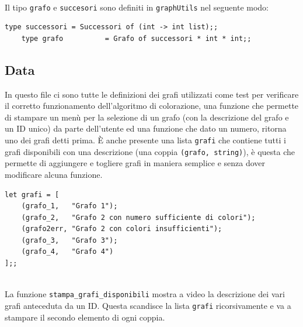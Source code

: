 \ \\
Il tipo \lstinline[style=cmd]|grafo| e \lstinline[style=cmd]|succesori|  sono definiti in \lstinline[style=cmd]|graphUtils| nel seguente modo:

\begin{lstlisting}[style=caml]
	type successori = Successori of (int -> int list);;
	type grafo 			= Grafo of successori * int * int;;
\end{lstlisting}

\subsection{Data}
In questo file ci sono tutte le definizioni dei grafi utilizzati come test per verificare il corretto funzionamento dell'algoritmo di colorazione, una funzione che permette di stampare un menù per la selezione di un grafo (con la descrizione del grafo e un ID unico) da parte dell'utente ed una funzione che dato un numero, ritorna uno dei grafi detti prima.
\`{E} anche presente una lista \lstinline[style=cmd]|grafi| che contiene tutti i grafi disponibili con una descrizione (una coppia \lstinline[style=cmd]|(grafo, string)|), è questa che permette di aggiungere e togliere grafi in maniera semplice e senza dover modificare alcuna funzione.

\begin{lstlisting}[style=caml, caption={Lista di coppie (grafo,string) utilizzata per assiocare ad un grafo una descrizione.}]
let grafi = [
	(grafo_1,   "Grafo 1"); 
	(grafo_2,   "Grafo 2 con numero sufficiente di colori"); 
	(grafo2err, "Grafo 2 con colori insufficienti"); 
	(grafo_3,   "Grafo 3"); 
	(grafo_4,   "Grafo 4")
];;
\end{lstlisting}
\ \\
La funzione \lstinline[style=cmd]|stampa_grafi_disponibili| mostra a video la descrizione dei vari grafi anteceduta da un ID. Questa scandisce la lista \lstinline[style=cmd]|grafi| ricorsivamente e va a stampare il secondo elemento di ogni coppia.

